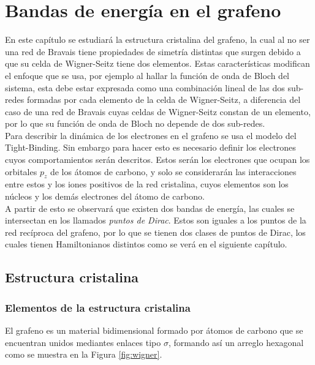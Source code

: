 \chapter{Bandas de energía en el grafeno}\label{cap.2}
En este capítulo se estudiará la estructura cristalina del grafeno, la cual al no ser una red de Bravais tiene propiedades de simetría distintas que surgen debido a que su celda de Wigner-Seitz tiene dos elementos. Estas características modifican el enfoque que se usa, por ejemplo al hallar la función de onda de Bloch del sistema, esta debe estar expresada como una combinación lineal de las dos sub-redes formadas por cada elemento de la celda de Wigner-Seitz, a diferencia del caso de una red de Bravais cuyas celdas de Wigner-Seitz constan de un elemento, por lo que su función de onda de Bloch no depende de dos sub-redes.\\ 
Para describir la dinámica de los electrones en el grafeno se usa el modelo del Tight-Binding. Sin embargo para hacer esto es necesario definir los electrones cuyos comportamientos serán descritos. Estos serán los electrones que ocupan los orbitales $p_z$ de los átomos de carbono, y solo se considerarán las interacciones entre estos y los iones positivos de la red cristalina, cuyos elementos son los núcleos y los demás electrones del átomo de carbono.\\
A partir de esto se observará que existen dos bandas de energía, las cuales se intersectan en los llamados \emph{puntos de Dirac}. Estos son iguales a los puntos de la red recíproca del grafeno, por lo que se tienen dos clases de puntos de Dirac, los cuales tienen Hamiltonianos distintos como se verá en el siguiente capítulo. 



\section{Estructura cristalina} \renewcommand{\thefootnote}{\arabic{footnote}} %
\subsection{Elementos de la estructura cristalina}
El grafeno es un material bidimensional formado por átomos de carbono que se encuentran unidos mediantes enlaces tipo $\sigma$, formando así un arreglo hexagonal como se muestra en la Figura \ref{fig:wigner}.

